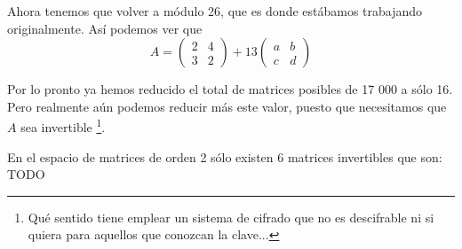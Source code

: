 \begin{example}
Ahora tenemos que volver a módulo 26, que es donde estábamos trabajando originalmente. Así podemos ver que
\[A = \left( \begin{array}{cc}
2 & 4 \\
3 & 2  \end{array} \right) + 13 \left( \begin{array}{cc}
a & b \\
c & d  \end{array} \right)\]

Por lo pronto ya hemos reducido el total de matrices posibles de 17 000 a sólo 16. Pero realmente aún podemos reducir más este valor, puesto que necesitamos que $A$ sea invertible \footnote{Qué sentido tiene emplear un sistema de cifrado que no es descifrable ni si quiera para aquellos que conozcan la clave...}.

En el espacio de matrices de orden 2 sólo existen 6 matrices invertibles que son:
TODO
\end{example}